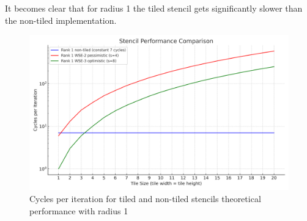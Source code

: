 It becomes clear that for radius 1 the tiled stencil gets significantly slower than the non-tiled implementation. 
\begin{figure}
    \centering
    \includegraphics[width=0.5\linewidth]{stencil_performance_comparison.png}
    \caption{Cycles per iteration for tiled and non-tiled stencils theoretical performance with radius 1}
    \label{fig:enter-label}
\end{figure} 